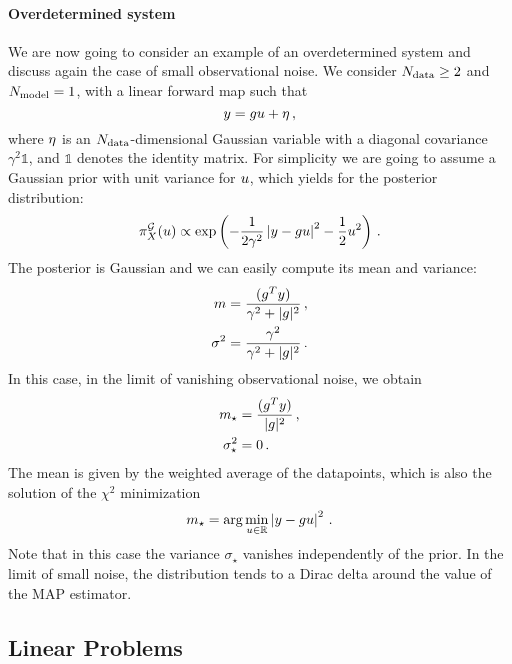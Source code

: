 \paragraph{Overdetermined system}
We are now going to consider an example of an overdetermined system and discuss
again the case of small observational noise. We consider $N_{\rm data}\geq 2$ and
$N_{\rm model}=1$, with a linear forward map such that
\begin{equation}
 \label{eq:OverDetForwMap}
 y = g u  + \eta\, ,
\end{equation} 
where $\eta$ is an $N_{\rm data}$-dimensional Gaussian variable with a diagonal
covariance $\gamma^2 \mathbb{1}$, and $\mathbb{1}$ denotes the identity matrix.
For simplicity we are going to assume a Gaussian prior with unit variance for
$u$, which yields for the posterior distribution:
\begin{equation}
  \label{eq:OverDetPost}
  \pi_{X}^{\mathcal{G}}(u) 
    \propto 
    \exp\left(
      -\frac{1}{2\gamma^2} \left| y - g u \right|^2
      -\frac12 u^2
    \right)\, .
\end{equation} 
The posterior is Gaussian and we can easily compute its mean and variance: 
\begin{align}
  m &= \frac{(g^T y)}{\gamma^2 + |g|^2} \, , \\
  \sigma^2 &=
    \frac{\gamma^2}{\gamma^2 + |g|^2}\, .
\end{align}
In this case, in the limit of vanishing observational noise, we obtain
\begin{align}
  m_\star &= \frac{(g^T y)}{|g|^2} \, ,\\
  \sigma_\star^2 &= 0\, .
\end{align}
The mean is given by the weighted average of the datapoints, which is also the solution of the $\chi^2$ minimization
\begin{equation}
  m_\star = \arg\min_{u\in\mathbb{R}} \left|y - g u\right|^2\, .
\end{equation}
Note that in this case the variance $\sigma_\star$ vanishes independently of the
prior. In the limit of small noise, the distribution tends to a Dirac delta
around the value of the MAP estimator.  

\subsection{Linear Problems}
\label{sec:LinProbs}

